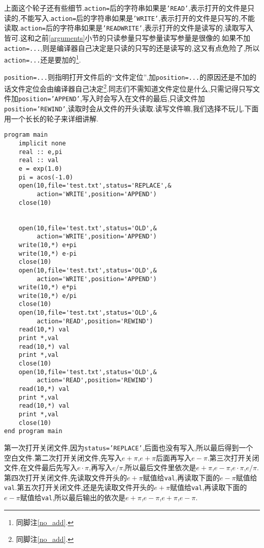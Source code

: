 上面这个轮子还有些细节.\texttt{action=}后的字符串如果是\texttt{'READ'},表示打开的文件是只读的,不能写入.\texttt{action=}后的字符串如果是\texttt{'WRITE'},表示打开的文件是只写的,不能读取.\texttt{action=}后的字符串如果是\texttt{'READWRITE'},表示打开的文件是读写的,读取写入皆可.这和之前\ref{arguments}小节的只读参量只写参量读写参量是很像的.如果不加\texttt{action=...},则是编译器自己决定是只读的只写的还是读写的,这又有点危险了,所以\texttt{action=...}还是要加的\footnote{同脚注\ref{no_add}.}.

\texttt{position=...}则指明打开文件后的``文件定位'',加\texttt{position=...}的原因还是不加的话文件定位会由编译器自己决定\footnote{同脚注\ref{no_add}.}.同志们不需知道文件定位是什么,只需记得只写文件加\texttt{position='APPEND'},写入时会写入在文件的最后,只读文件加\texttt{position='REWIND'},读取时会从文件的开头读取.读写文件嘛,我们选择不玩儿.下面用一个长长的轮子来详细讲解.
\begin{lstlisting}
program main
    implicit none
    real :: e,pi
    real :: val
    e = exp(1.0)
    pi = acos(-1.0)
    open(10,file='test.txt',status='REPLACE',&
         action='WRITE',position='APPEND')
    close(10)


    open(10,file='test.txt',status='OLD',&
         action='WRITE',position='APPEND')
    write(10,*) e+pi
    write(10,*) e-pi
    close(10)
    open(10,file='test.txt',status='OLD',&
         action='WRITE',position='APPEND')
    write(10,*) e*pi
    write(10,*) e/pi
    close(10)
    open(10,file='test.txt',status='OLD',&
         action='READ',position='REWIND')
    read(10,*) val
    print *,val
    read(10,*) val
    print *,val
    close(10)
    open(10,file='test.txt',status='OLD',&
         action='READ',position='REWIND')
    read(10,*) val
    print *,val
    read(10,*) val
    print *,val
    close(10)
end program main
\end{lstlisting}
第一次打开关闭文件,因为\texttt{status='REPLACE'},后面也没有写入,所以最后得到一个空白文件.第二次打开关闭文件,先写入$e+\pi$,$e+\pi$后面再写入$e-\pi$.第三次打开关闭文件,在文件最后先写入$e\cdot\pi$,再写入$e/\pi$,所以最后文件里依次是$e+\pi$,$e-\pi$,$e\cdot\pi$,$e/\pi$.第四次打开关闭文件,先读取文件开头的$e+\pi$赋值给\texttt{val},再读取下面的$e-\pi$赋值给\texttt{val}.第五次打开关闭文件,还是先读取文件开头的$e+\pi$赋值给\texttt{val},再读取下面的$e-\pi$赋值给\texttt{val},所以最后输出的依次是$e+\pi$,$e-\pi$,$e+\pi$,$e-\pi$.

